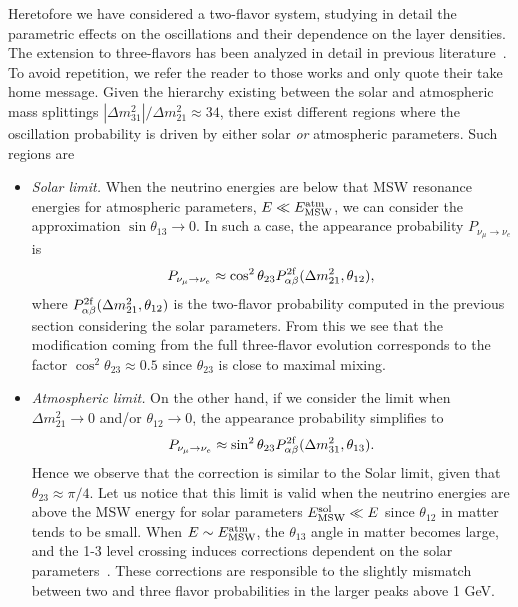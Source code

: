 Heretofore we have considered a two-flavor system, studying in detail the parametric effects on the oscillations and their dependence on the layer densities. 
The extension to three-flavors has been analyzed in detail in previous literature~\cite{Ohlsson:1999um,Palomares-Ruiz:2004cmm,Akhmedov:2005yj,Akhmedov:2006hb,Akhmedov:2008qt}. 
To avoid repetition, we refer the reader to those works and only quote their take home message.
Given the hierarchy existing between the solar and atmospheric mass splittings $|\Delta m_{31}^2|/\Delta m_{21}^2\approx 34$,  there exist different regions where the oscillation probability is driven by either solar \textit{or} atmospheric parameters. 
Such regions are
\begin{itemize}
	\item \emph{Solar limit.} When the neutrino energies are below that MSW resonance energies for atmospheric parameters, $E\ll E_{\rm MSW}^{\rm atm}$, we can consider the approximation $\sin\theta_{13}\to 0$. 
	In such a case, 
	the appearance probability $P_{\nu_\mu\to\nu_e}$ is
	\begin{align}\label{eq:3fPS}
		P_{\nu_\mu\to\nu_e} 
		\approx\cos^2\theta_{23}P^{\rm 2f}_{\alpha\beta}(\Delta m_{21}^2,\theta_{12}),
	\end{align}
	where $P^{\rm 2f}_{\alpha\beta}(\Delta m_{21}^2,\theta_{12})$ is the two-flavor probability computed in the previous section considering the solar parameters. 
	From this we see that the modification coming from the full three-flavor evolution corresponds to the factor $\cos^2\theta_{23}\approx 0.5$ since $\theta_{23}$ is close to maximal mixing.
	\item \emph{Atmospheric limit.} On the other hand, if we consider the limit when $\Delta m_{21}^2\to 0$ and/or $\theta_{12}\to 0$, 
	the appearance probability simplifies to 
	\begin{align}\label{eq:3fPA}
		P_{\nu_\mu\to\nu_e}
		\approx\sin^2\theta_{23}P^{\rm 2f}_{\alpha\beta}(\Delta m_{31}^2,\theta_{13}).
	\end{align}
	Hence we observe that the correction is similar to the Solar limit, given that $\theta_{23}\approx \pi/4$. 
	Let us notice that this limit is valid when the neutrino energies are above the MSW energy for solar parameters $E_{\rm MSW}^{\rm sol}\ll E$ since $\theta_{12}$ in matter tends to be small. 
	When $E\sim E_{\rm MSW}^{\rm atm}$, the $\theta_{13}$ angle in matter becomes large, and the 1-3 level crossing induces corrections dependent on the solar parameters~\cite{Akhmedov:2008qt}. These corrections are responsible to the slightly mismatch between two and three flavor probabilities in the larger peaks above 1 GeV. 
\end{itemize}

